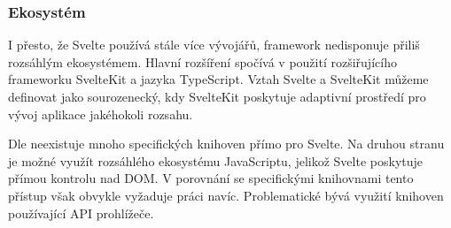 \subsubsection{Ekosystém}

I přesto, že Svelte používá stále více vývojářů, framework nedisponuje přiliš rozsáhlým ekosystémem. Hlavní rozšíření spočívá v použití rozšiřujícího frameworku SvelteKit a jazyka TypeScript. 
Vztah Svelte a SvelteKit můžeme definovat jako sourozenecký, kdy SvelteKit poskytuje adaptivní prostředí pro vývoj aplikace jakéhokoli rozsahu.

Dle \cite{sveltedailydev} neexistuje mnoho specifických knihoven přímo pro Svelte. 
Na druhou stranu je možné využít rozsáhlého ekosystému JavaScriptu, jelikož Svelte poskytuje přímou kontrolu nad DOM. 
V porovnání se specifickými knihovnami tento přístup však obvykle vyžaduje práci navíc. 
Problematické bývá využití knihoven používající API prohlížeče.\cite{svelteheyreliable,sveltedailydev,sveltejslibs}
